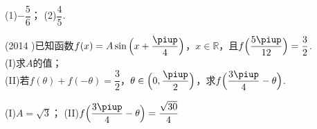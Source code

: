 \begin{exercise}
      \begin{answer}
        (1)$-\dfrac56$；
        (2)$\dfrac45$.
      \end{answer}
    \newpage
    \item%
      (2014 )已知函数$f(x)=A\sin{\Bigl(x+\dfrac{\piup}4\Bigr)}$，$x\in\mathbb{R}$，且$f\Bigl(\dfrac{5\piup}{12}\Bigr)=\dfrac{3}2$.\\
      (I)求$A$的值；\\
      (II)若$f(\theta)+f(-\theta)=\dfrac{3}2$，$\theta\in \Bigl(0,\dfrac{\piup}2\Bigr)$，求$f\Bigl(\dfrac{3\piup}4-\theta\Bigr)$.
      \begin{answer}
        (I)$A=\sqrt{3}$；
        (II)$f\Bigl(\dfrac{3\piup}4-\theta\Bigr)=\dfrac{\sqrt{30}}4$
      \end{answer}
    \vspace{4cm}

\end{exercise}
